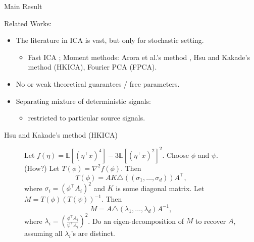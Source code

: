 \documentclass[final]{beamer} %
\newcommand{\EEp}[1]{\mathbb{E}\left[#1\right]}
\begin{document}
\begin{frame}[c]
\begin{columns}[t,totalwidth=\textwidth]
\begin{column}{.32\textwidth}
\begin{block}{Main Result}
\begin{center}
\begin{tcolorbox}[title = \vspace{0.4cm}\textbf{\large Main Result} \vspace{0.4cm}, title filled, width = 0.95\textwidth, colback = uofagreen!10, colframe = red]
				\end{tcolorbox}
			\end{center}
				{\large Related Works:}
			\begin{itemize}
						\item The literature in ICA is vast, but only for stochastic setting.
						\begin{itemize}
							\item Fast ICA \citep{hyvarinen1999fast}; Moment methods:
							Arora et al.'s method \citep{arora2012provable},
							Hsu and Kakade's method \citep{hsu2013learning} (HKICA), 
							Fourier PCA \citep{goyal2014fourier} (FPCA).	
						\end{itemize}
						\item No or weak theoretical guarantees / free parameters.
						\item Separating mixture of deterministic signals: \citet{kirimoto2011separation,forootan2013separation}
						\begin{itemize}
						\item restricted to particular source signals.
						\end{itemize}
					\end{itemize}
		\end{block}
		\vspace{0.5ex}
			\begin{block}{Hsu and Kakade's method (HKICA)}
				\begin{figure}
				\begin{algorithmic}[1]
					\STATE Let $f(\eta) = \EEp{(\eta^{\top}x)^4} - 3 \EEp{(\eta^{\top}x)^2}^2$.
					\STATE  Choose $\phi$ and $\psi$. (How?)
					\STATE Let $T(\phi) = \nabla^2 f(\phi)$. Then 
						\[T(\phi) = AK \triangle\left( (\sigma_1,\ldots,  \sigma_d)\right)A^{\top},
						\]
						where $\sigma_i = \left(\phi^{\top}A_i\right)^2$ and $K$ is some diagonal matrix.
					\STATE Let $M = T(\phi)(T(\psi))^{-1}$. Then 
						\[M = A \triangle \left( \lambda_1, \ldots, \lambda_d \right) A^{-1},
						\]
						where $\lambda_i = \left(\frac{\phi^{\top}A_i}{\psi^{\top}A_i}\right)^2$.
					\STATE Do an eigen-decomposition of $M$ to recover $A$, assuming all $\lambda_i$'s are distinct.
				\end{algorithmic}
				\end{figure}

			\end{block}
	\end{column}


\end{columns}
\end{frame}
\end{document}
